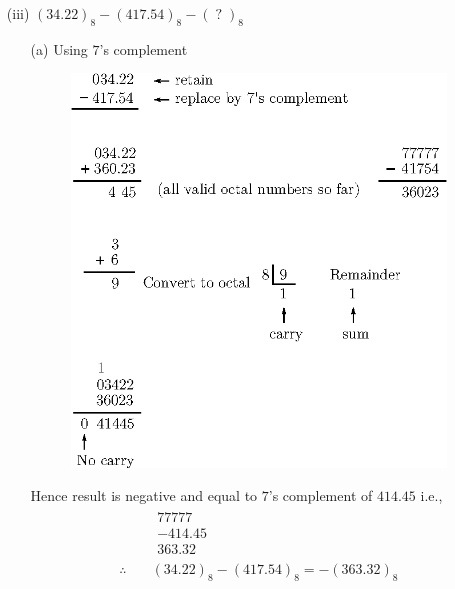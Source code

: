 \begin{solution}
\begin{itemize}
\item[(iii)] $(34.22)_{8}-(417.54)_{8}-(\;?\;)_{8}$
\begin{itemize}
\item[(a)] Using $7$'s complement
\begin{figure}[H]
\centering
\includegraphics[scale=1.05]{chap6/fig67.eps}
\end{figure}
Hence result is negative and equal to $7$'s complement of $414.45$ i.e.,
\begin{align*}
& \begin{array}{r}
    77777\\
    -414.45\\
    \hline
    363.32
  \end{array}\\
\therefore\quad & (34.22)_{8}-(417.54)_{8}=-(363.32)_{8}
\end{align*}


\end{itemize}
\end{itemize}
\end{solution}
